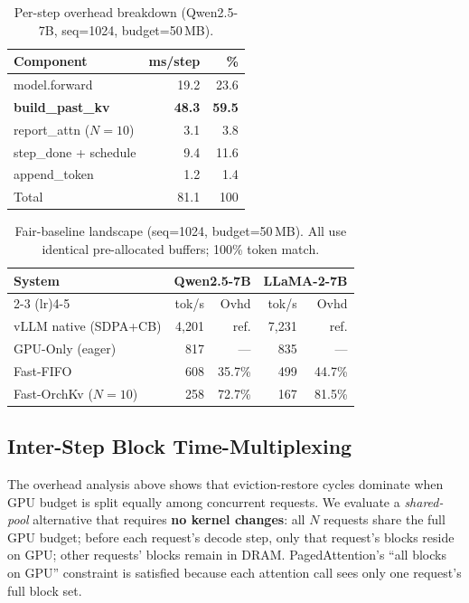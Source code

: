 \documentclass[conference]{IEEEtran}
\begin{document}
\begin{table}[t]
\centering
\caption{Per-step overhead breakdown (Qwen2.5-7B, seq=1024, budget=50\,MB).}
\label{tab:overhead-breakdown}
\small
\setlength{\tabcolsep}{10pt}
\begin{tabular}{@{}lrr@{}}
\toprule
Component & ms/step & \% \\
\midrule
model.forward & 19.2 & 23.6 \\
\textbf{build\_past\_kv} & \textbf{48.3} & \textbf{59.5} \\
report\_attn ($N{=}10$) & 3.1 & 3.8 \\
step\_done + schedule & 9.4 & 11.6 \\
append\_token & 1.2 & 1.4 \\
\midrule
Total & 81.1 & 100 \\
\bottomrule
\end{tabular}
\end{table}

\begin{table}[t]
\centering
\caption{Fair-baseline landscape (seq=1024, budget=50\,MB). All use identical pre-allocated buffers; 100\% token match.}
\label{tab:fair-baseline}
\small
\setlength{\tabcolsep}{6pt}
\begin{tabular}{@{}lrrrr@{}}
\toprule
System & \multicolumn{2}{c}{Qwen2.5-7B} & \multicolumn{2}{c}{LLaMA-2-7B} \\
\cmidrule(lr){2-3} \cmidrule(lr){4-5}
& tok/s & Ovhd & tok/s & Ovhd \\
\midrule
vLLM native (SDPA+CB)  & 4{,}201 & ref. & 7{,}231 & ref. \\
GPU-Only (eager)        & 817 & --- & 835 & --- \\
Fast-FIFO               & 608 & 35.7\% & 499 & 44.7\% \\
Fast-OrchKv ($N{=}10$)  & 258 & 72.7\% & 167 & 81.5\% \\
\bottomrule
\end{tabular}
\end{table}

\subsection{Inter-Step Block Time-Multiplexing}
\label{sec:time-multiplex}

The overhead analysis above shows that eviction-restore cycles dominate when GPU budget is split equally among concurrent requests. We evaluate a \emph{shared-pool} alternative that requires \textbf{no kernel changes}: all $N$ requests share the full GPU budget; before each request's decode step, only that request's blocks reside on GPU; other requests' blocks remain in DRAM. PagedAttention's ``all blocks on GPU'' constraint is satisfied because each attention call sees only one request's full block set.
\end{document}
